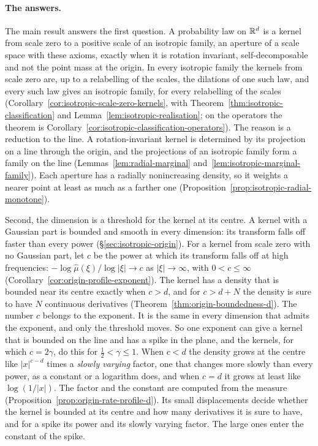 \paragraph{The answers.} The main result answers the first question. A probability law on
$\mathbb{R}^d$ is a kernel from scale zero to a positive scale of an isotropic family, an aperture of a
scale space with these axioms, exactly when it is
rotation invariant, self-decomposable and not the point mass at the origin. In every isotropic
family the kernels from scale zero are, up to a relabelling of the scales, the dilations of one
such law, and every such law gives an isotropic family, for every relabelling of the scales
(Corollary~\ref{cor:isotropic-scale-zero-kernels}, with
Theorem~\ref{thm:isotropic-classification} and Lemma~\ref{lem:isotropic-realisation}; on the
operators the theorem is Corollary~\ref{cor:isotropic-classification-operators}). The reason is
a reduction to the line.
A rotation-invariant kernel is determined by its projection on a line through the origin, and
the projections of an isotropic family form a family on the line
(Lemmas~\ref{lem:radial-marginal} and~\ref{lem:isotropic-marginal-family}). Each aperture has
a radially nonincreasing density, so it weights a nearer point at least as much as a farther one
(Proposition~\ref{prop:isotropic-radial-monotone}).

Second, the dimension is a threshold for the kernel at its centre. A kernel with a Gaussian part
is bounded and smooth in every dimension: its transform falls off faster than every power
(\S\ref{sec:isotropic-origin}). For a kernel from scale zero with no Gaussian part,
let $c$ be the power at which its transform falls off at high frequencies:
$-\log\widehat\mu(\xi)/\log|\xi| \to c$ as $|\xi| \to \infty$, with $0 < c \le \infty$
(Corollary~\ref{cor:origin-profile-exponent}). The kernel has a density that is bounded near its
centre exactly when $c > d$, and for $c > d + N$ the density is sure to have $N$ continuous
derivatives (Theorem~\ref{thm:origin-boundedness-d}). The number $c$ belongs to the exponent. It
is the same in every dimension that admits the exponent, and only the threshold moves. So one
exponent can give a kernel that is bounded on the line and has a spike in the plane, and the
\Matern{} kernels, for which $c = 2\gamma$, do this for $\tfrac12 < \gamma \le 1$. When $c < d$
the density grows at the centre like $|x|^{c-d}$ times a \emph{slowly varying} factor, one that
changes more slowly than every power, as a constant or a logarithm does, and when $c = d$ it
grows at least like $\log(1/|x|)$. The factor and the constant are computed from the \Levy{}
measure (Proposition~\ref{prop:origin-rate-profile-d}). Its small displacements decide whether
the kernel is bounded at its centre and how many derivatives it is sure to have, and for a
spike its power and its slowly varying factor. The large ones enter the constant of the spike.

